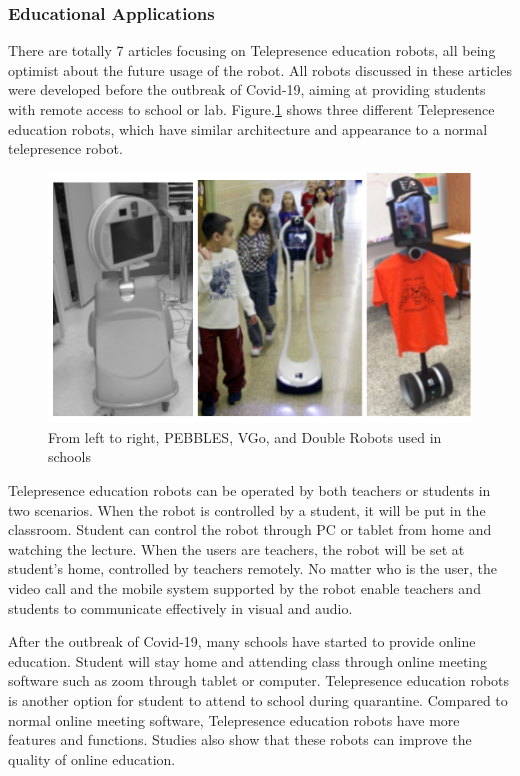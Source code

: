 \documentclass[a4paper]{article}
\begin{document}
\subsubsection{Educational Applications} 
    There are totally 7 articles focusing on Telepresence education robots, all being optimist about the future usage of the robot. All robots discussed in these articles were developed before the outbreak of Covid-19, aiming at providing students with remote access to school or lab. Figure.\ref{Education robot} shows three different Telepresence education robots, which have similar architecture and appearance to a normal telepresence robot. 
\begin{figure}[H]
    \centering
    \includegraphics[scale=0.25]{Education.png}
    \caption{From left to right, PEBBLES, VGo, and Double
    Robots used in schools}
    \label{Education robot}
\end{figure}
    Telepresence education robots can be operated by both teachers or students in two scenarios. When the robot is controlled by a student, it will be put in the classroom. Student can control the robot through PC or tablet from home and watching the lecture. When the users are teachers, the robot will be set at student's home, controlled by teachers remotely. No matter who is the user, the video call and the mobile system supported by the robot enable teachers and students to communicate effectively in visual and audio.
\par 
    After the outbreak of Covid-19, many schools have started to provide online education. Student will stay home and attending class through online meeting software such as zoom through tablet or computer. Telepresence education robots is another option for student to attend to school during quarantine. Compared to normal online meeting software, Telepresence education robots have more features and functions. Studies also show that these robots can improve the quality of online education.
\end{document}
